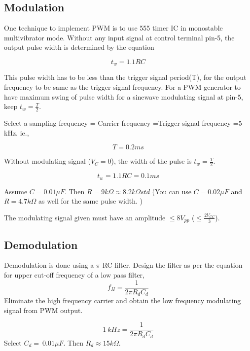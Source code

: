 \subsection*{Modulation}

One technique to implement PWM is to use 555 timer IC in monostable multivibrator mode. Without any input signal at control terminal pin-5, the output pulse width is determined by the equation 

\begin{equation}
t_w = 1.1 R C
\end{equation}

This pulse width has to be less than the trigger signal period(T), for the output frequency to be same as the trigger signal frequency.  For a PWM generator to have maximum swing of pulse width for a sinewave modulating signal at pin-5, keep $t_w=\frac{T}{2}$. 

\noindent Select a sampling frequency = Carrier frequency =Trigger signal frequency =5 kHz. ie.,

\begin{equation}
T = 0.2 ms
\end{equation}

\noindent Without modulating signal ($V_C = 0$), the width of the pulse is $t_w=\frac{T}{2}$.

\begin{equation}
t_w=1.1 RC = 0.1 ms
\end{equation}

Assume $C=0.01 \mu F$. Then  $R= 9k\Omega \approx 8.2 k\Omega std	$ (You can use  $C=0.02 \mu F$ and $R=4.7k\Omega$ as well for the same pulse width. )

The modulating signal given must have an amplitude $\le 8 V_{pp}$ ($\le \frac{2V_{CC}}{3}$).

\subsection*{Demodulation}
Demodulation is done using a  $\pi$ RC filter.
\noindent Design the filter as per the equation for upper cut-off frequency of a low pass filter,
\begin{equation}
f_H=\frac{1}{2\pi R_dC_d}
\end{equation}
\noindent Eliminate the high frequency carrier and obtain the low frequency modulating signal from PWM output.

\begin{equation}
1\ kHz=\frac{1}{2\pi R_dC_d}
\end{equation}
\noindent Select $C_d=\ 0.01 \mu F$. Then $R_d \approx 15k\Omega$.

